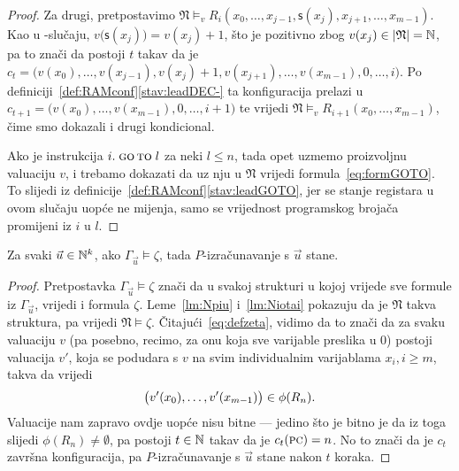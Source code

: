 \begin{proof}
Za drugi, pretpostavimo $\mathfrak N\models_v R_i(x_0,\dotsc,x_{j-1},\mathsf s(x_j),x_{j+1},\dotsc,x_{m-1})$. Kao u \inc-slučaju, $v\bigl(\mathsf s(x_j)\bigr)=v(x_j)+1$, što je pozitivno zbog $v(x_j)\in\lvert\mathfrak N\rvert={\mathbb N}$, pa to znači da postoji $t$ takav da je $c_t=\bigl(v(x_0),\dotsc,v(x_{j-1}),v(x_j)+1,v(x_{j+1}),\dotsc,v(x_{m-1}),0,\dotsc,i\bigr)$. Po definiciji~\ref{def:RAMconf}\eqref{stav:leadDEC-} ta konfiguracija prelazi u $c_{t+1}=\bigl(v(x_0),\dotsc,v(x_{m-1}),0,\dotsc,i+1\bigr)$ te vrijedi $\mathfrak N\models_v R_{i+1}(x_0,\dotsc,x_{m-1})$, čime smo dokazali i drugi kondicional.

Ako je instrukcija $i.\;\textsc{go\,to}\;l$ za neki $l\le n$, tada opet uzmemo proizvoljnu valuaciju $v$, i trebamo dokazati da uz nju u $\mathfrak N$ vrijedi formula~\eqref{eq:formGOTO}. To slijedi iz definicije~\ref{def:RAMconf}\eqref{stav:leadGOTO}, jer se stanje registara u ovom slučaju uopće ne mijenja, samo se vrijednost programskog brojača promijeni iz $i$ u $l$.
\end{proof}

\begin{propozicija}[{name=[zaključivanje povlači zaustavljanje]}]\label{pp:models>stop}
Za svaki $\vec u\in{\mathbb N}^k$, ako $\Gamma_{\vec u}\models\zeta$, tada $P$-izračunavanje s $\vec u$ stane.
\end{propozicija}
\begin{proof}
Pretpostavka $\Gamma_{\vec u}\models\zeta$ znači da u svakoj strukturi u kojoj vrijede sve formule iz $\Gamma_{\vec u}$, vrijedi i formula $\zeta$. Leme~\ref{lm:Npiu} i~\ref{lm:Niotai} pokazuju da je $\mathfrak N$ takva struktura, pa vrijedi $\mathfrak N\models\zeta$. Čitajući~\eqref{eq:defzeta}, vidimo da to znači da za svaku valuaciju $v$ (pa posebno, recimo, za onu koja sve varijable preslika u $0$) postoji valuacija $v'$, koja se podudara s $v$ na svim individualnim varijablama $x_i,i\ge m$, takva da vrijedi
\begin{equation}
    \bigl(v'(x_0),\dotsc,v'(x_{m-1})\bigr)\in\phi(R_n)\text.
\end{equation}
Valuacije nam zapravo ovdje uopće nisu bitne --- jedino što je bitno je da iz toga slijedi $\phi(R_n)\ne\emptyset$, pa postoji $t\in{\mathbb N}$ takav da je $c_t(\textsc{pc})=n$. No to znači da je $c_t$ završna konfiguracija, pa $P$-izračunavanje s $\vec u$ stane nakon $t$ koraka.
\end{proof}


